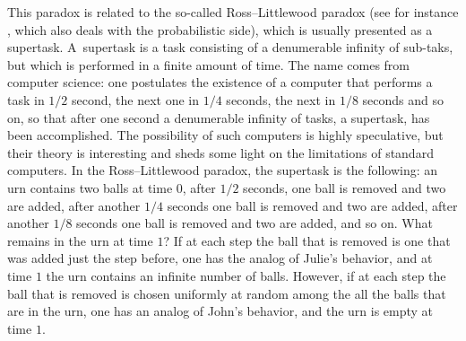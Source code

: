 \documentclass[pdftex]{sigma}%
\begin{document}
This paradox is related to the so-called Ross--Littlewood paradox (see for instance \cite[Example~$6a$]{Ross}, which also deals with the probabilistic side), which is usually presented as a supertask. A~supertask is a task consisting of a denumerable infinity of sub-taks, but which is performed in a finite amount of time. The name comes from computer science: one postulates the existence of a computer that performs a task in $1/2$ second, the next one in $1/4$ seconds, the next in $1/8$ seconds and so on, so that after one second a denumerable infinity of tasks, a supertask, has been accomplished. The possibility of such computers is highly speculative, but their theory is interesting and sheds some light on the limitations of standard computers. In the Ross--Littlewood paradox, the supertask is the following: an urn contains two balls at time 0, after $1/2$ seconds, one ball is removed and two are added, after another $1/4$ seconds one ball is removed and two are added, after another $1/8$ seconds one ball is removed and two are added, and so on. What remains in the urn at time $1$? If at each step the ball that is removed is one that was added just the step before, one has the analog of Julie's behavior, and at time $1$ the urn contains an infinite number of balls. However, if at each step the ball that is removed is chosen uniformly at random among the all the balls that are in the urn, one has an analog of John's behavior, and the urn is empty at time $1$.
\end{document}
